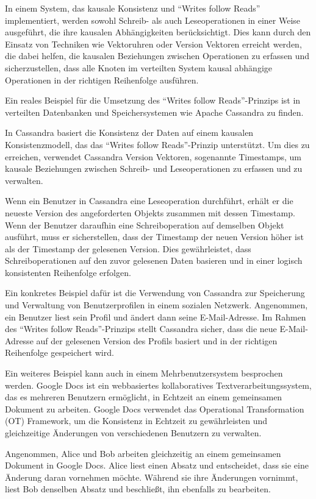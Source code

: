 In einem System, das kausale Konsistenz und \enquote{Writes follow Reads} implementiert, werden sowohl Schreib- als auch Leseoperationen in einer Weise ausgeführt, die ihre kausalen Abhängigkeiten berücksichtigt. Dies kann durch den Einsatz von Techniken wie Vektoruhren oder Version Vektoren erreicht werden, die dabei helfen, die kausalen Beziehungen zwischen Operationen zu erfassen und sicherzustellen, dass alle Knoten im verteilten System kausal abhängige Operationen in der richtigen Reihenfolge ausführen.

Ein reales Beispiel für die Umsetzung des \enquote{Writes follow Reads}-Prinzips ist in verteilten Datenbanken und Speichersystemen wie Apache Cassandra zu finden. 

In Cassandra basiert die Konsistenz der Daten auf einem kausalen Konsistenzmodell, das das \enquote{Writes follow Reads}-Prinzip unterstützt. Um dies zu erreichen, verwendet Cassandra Version Vektoren, sogenannte Timestamps, um kausale Beziehungen zwischen Schreib- und Leseoperationen zu erfassen und zu verwalten.

Wenn ein Benutzer in Cassandra eine Leseoperation durchführt, erhält er die neueste Version des angeforderten Objekts zusammen mit dessen Timestamp. Wenn der Benutzer daraufhin eine Schreiboperation auf demselben Objekt ausführt, muss er sicherstellen, dass der Timestamp der neuen Version höher ist als der Timestamp der gelesenen Version. Dies gewährleistet, dass Schreiboperationen auf den zuvor gelesenen Daten basieren und in einer logisch konsistenten Reihenfolge erfolgen.

Ein konkretes Beispiel dafür ist die Verwendung von Cassandra zur Speicherung und Verwaltung von Benutzerprofilen in einem sozialen Netzwerk. Angenommen, ein Benutzer liest sein Profil und ändert dann seine E-Mail-Adresse. Im Rahmen des \enquote{Writes follow Reads}-Prinzips stellt Cassandra sicher, dass die neue E-Mail-Adresse auf der gelesenen Version des Profils basiert und in der richtigen Reihenfolge gespeichert wird.

Ein weiteres Beispiel kann auch in einem Mehrbenutzersystem besprochen werden. Google Docs ist ein webbasiertes kollaboratives Textverarbeitungssystem, das es mehreren Benutzern ermöglicht, in Echtzeit an einem gemeinsamen Dokument zu arbeiten. Google Docs verwendet das Operational Transformation (OT) Framework, um die Konsistenz in Echtzeit zu gewährleisten und gleichzeitige Änderungen von verschiedenen Benutzern zu verwalten.

Angenommen, Alice und Bob arbeiten gleichzeitig an einem gemeinsamen Dokument in Google Docs. Alice liest einen Absatz und entscheidet, dass sie eine Änderung daran vornehmen möchte. Während sie ihre Änderungen vornimmt, liest Bob denselben Absatz und beschließt, ihn ebenfalls zu bearbeiten.

